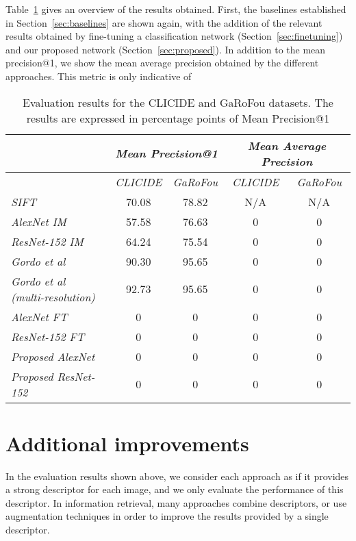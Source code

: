 Table~\ref{tab:results} gives an overview of the results obtained. First,
the baselines established in Section~\ref{sec:baselines} are shown
again, with the addition of the relevant results obtained by fine-tuning
a classification network (Section~\ref{sec:finetuning}) and our
proposed network (Section~\ref{sec:proposed}).
In addition to the mean precision@1, we show the mean average
precision obtained by the different approaches. This metric
is only indicative of

\begin{table}
\begin{tabular}{|l|c|c|c|c|}
\hline & \multicolumn{2}{c|}{\emph{Mean Precision@1}} &
\multicolumn{2}{c|}{\emph{Mean Average Precision}}\\
\hline & \emph{CLICIDE} & \emph{GaRoFou} & \emph{CLICIDE} & \emph{GaRoFou}\\
\hline \emph{SIFT} & 70.08 & 78.82 & N/A & N/A\\
\hline \emph{AlexNet IM} & 57.58 & 76.63 & 0 & 0\\
\hline \emph{ResNet-152 IM} & 64.24 & 75.54 & 0 & 0\\
\hline \emph{Gordo et al~\cite{gordo_deep_2016}}
& 90.30 & 95.65 & 0 & 0\\
\hline \emph{Gordo et al~\cite{gordo_deep_2016} (multi-resolution)}
& 92.73 & 95.65 & 0 & 0\\
\hline \emph{AlexNet FT} & 0 & 0 & 0 & 0\\ %
\hline \emph{ResNet-152 FT} & 0 & 0 & 0 & 0\\
\hline \emph{Proposed AlexNet} & 0 & 0 & 0 & 0\\ %
\hline \emph{Proposed ResNet-152} & 0 & 0 & 0 & 0\\
\hline
\end{tabular}
\caption{Evaluation results for the CLICIDE and GaRoFou datasets.
The results are expressed in percentage points of
Mean Precision@1\label{tab:results}}
\end{table}

\section{Additional improvements}
In the evaluation results shown above, we consider each approach
as if it provides a strong descriptor for each image, and we only
evaluate the performance of this descriptor.
In information retrieval, many approaches combine descriptors,
or use augmentation techniques in order to improve the results
provided by a single descriptor.

